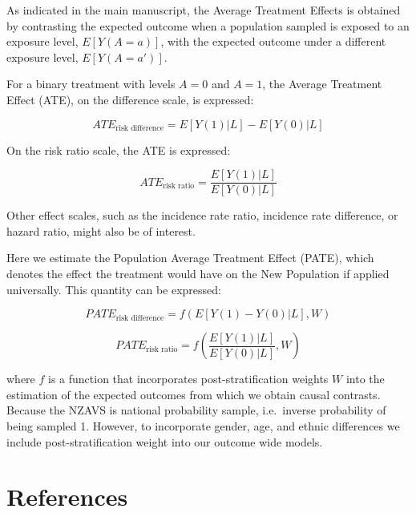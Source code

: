 \documentclass[
  singlecolumn]{report}
\begin{document}
As indicated in the main manuscript, the Average Treatment Effects is
obtained by contrasting the expected outcome when a population sampled
is exposed to an exposure level, \(E[Y(A = a)]\), with the expected
outcome under a different exposure level, \(E[Y(A=a')]\).

For a binary treatment with levels \(A=0\) and \(A=1\), the Average
Treatment Effect (ATE), on the difference scale, is expressed:

\[ATE_{\text{risk difference}} = E[Y(1)|L] - E[Y(0)|L]\]

On the risk ratio scale, the ATE is expressed:

\[ATE_{\text{risk ratio}} = \frac{E[Y(1)|L]}{E[Y(0)|L]}\]

Other effect scales, such as the incidence rate ratio, incidence rate
difference, or hazard ratio, might also be of interest.

Here we estimate the Population Average Treatment Effect (PATE), which
denotes the effect the treatment would have on the New Population if
applied universally. This quantity can be expressed:

\[PATE_{\text{risk difference}} = f(E[Y(1) - Y(0)|L], W)\]

\[PATE_{\text{risk ratio}} = f\left(\frac{E[Y(1)|L]}{E[Y(0)|L]}, W\right)\]

where \(f\) is a function that incorporates post-stratification weights
\(W\) into the estimation of the expected outcomes from which we obtain
causal contrasts. Because the NZAVS is national probability sample,
i.e.~inverse probability of being sampled 1. However, to incorporate
gender, age, and ethnic differences we include post-stratification
weight into our outcome wide models.

\hypertarget{references}{%
\section*{References}\label{references}}
\end{document}
